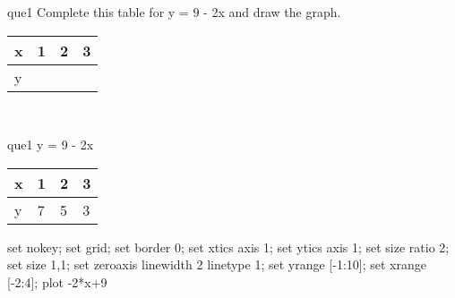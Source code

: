 \documentclass[13.5pt, varwidth=true]{beamer}
\begin{document}
\begin{frame}[shrink=19,fragile]
	\begin{beamercolorbox}[rounded=true, left, shadow=true,wd=14.8cm]{que1}
		 Complete this table for y = 9 - 2x and draw the graph. \\[0.3cm] \renewcommand{\arraystretch}{1.2}\begin{tabular}{|C|C|C|C|} \hline x & 1 & 2 & 3 \\ \hline y & & & \\ \hline \end{tabular}\\[0.3cm]
	\end{beamercolorbox}
\end{frame}
\begin{frame}[shrink=19,fragile]
	\begin{beamercolorbox}[rounded=true, left, shadow=true,wd=14.8cm]{que1}
		y = 9 - 2x\renewcommand{\arraystretch}{1.2}\begin{tabular}{|C|C|C|C|} \hline x & 1 & 2 & 3 \\ \hline y & 7 & 5 & 3\\ \hline \end{tabular}\begin{gnuplot}[terminal=pdf] set nokey; set grid; set border 0; set xtics axis 1; set ytics axis 1; set size ratio 2; set size 1,1; set zeroaxis linewidth 2 linetype 1; set yrange [-1:10]; set xrange [-2:4]; plot -2*x+9 \end{gnuplot}
	\end{beamercolorbox}
\end{frame}
\end{document}
